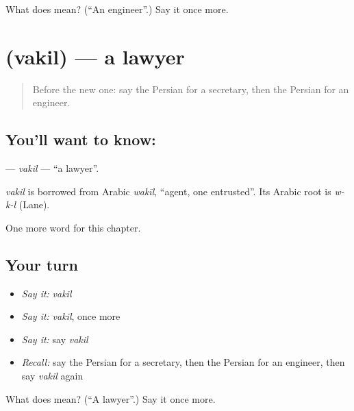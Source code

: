 \begin{tcolorbox}[breakable,colback=teal!4,colframe=teal!35!black,title={Before you move on}]
What does  mean? (\textquotedblleft{}An engineer\textquotedblright{}.) Say it once more.
\end{tcolorbox}
\section[\texorpdfstring{\fa{وکیل} (vakil)}{وکیل (vakil)}]{ (vakil) — a lawyer}

\label{lesson:FA-C250-vakil}



\begin{quote}
Before the new one: say the Persian for a secretary, then the Persian for an engineer.
\end{quote}

\subsection*{You'll want to know: }
\textbf{} — \emph{vakil} — \textquotedblleft{}a lawyer\textquotedblright{}.

\begin{cousinweb}
\emph{vakil} is borrowed from Arabic \emph{wakīl}, \textquotedblleft{}agent, one entrusted\textquotedblright{}. Its Arabic root is \emph{w-k-l} (Lane).
\end{cousinweb}

\begin{grammarlens}[title={What you've built}]
One more word for this chapter.
\end{grammarlens}

\subsection*{Your turn}
\begin{itemize}
\raggedright
  \item \emph{Say it:} \emph{vakil}
  \item \emph{Say it:} \emph{vakil}, once more
  \item \emph{Say it:} say \emph{vakil}
  \item \emph{Recall:} say the Persian for a secretary, then the Persian for an engineer, then say \emph{vakil} again
\end{itemize}

\begin{tcolorbox}[breakable,colback=teal!4,colframe=teal!35!black,title={Before you move on}]
What does  mean? (\textquotedblleft{}A lawyer\textquotedblright{}.) Say it once more.
\end{tcolorbox}
